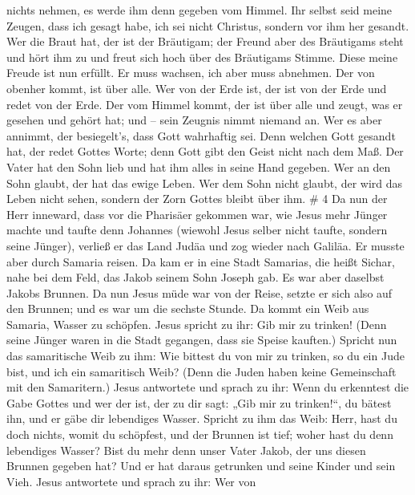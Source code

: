 nichts nehmen, es werde ihm denn gegeben vom Himmel.  Ihr
selbst seid meine Zeugen, dass ich gesagt habe, ich sei nicht Christus,
sondern vor ihm her gesandt.  Wer die Braut hat, der ist
der Bräutigam; der Freund aber des Bräutigams steht und hört ihm zu und
freut sich hoch über des Bräutigams Stimme. Diese meine Freude ist nun
erfüllt.  Er muss wachsen, ich aber muss abnehmen.
 Der von obenher kommt, ist über alle. Wer von der Erde
ist, der ist von der Erde und redet von der Erde. Der vom Himmel kommt,
der ist über alle  und zeugt, was er gesehen und gehört
hat; und -- sein Zeugnis nimmt niemand an.  Wer es aber
annimmt, der besiegelt's, dass Gott wahrhaftig sei.  Denn
welchen Gott gesandt hat, der redet Gottes Worte; denn Gott gibt den
Geist nicht nach dem Maß.  Der Vater hat den Sohn lieb und
hat ihm alles in seine Hand gegeben.  Wer an den Sohn
glaubt, der hat das ewige Leben. Wer dem Sohn nicht glaubt, der wird das
Leben nicht sehen, sondern der Zorn Gottes bleibt über ihm. \# 4
 Da nun der Herr inneward, dass vor die Pharisäer gekommen
war, wie Jesus mehr Jünger machte und taufte denn Johannes 
(wiewohl Jesus selber nicht taufte, sondern seine Jünger), 
verließ er das Land Judäa und zog wieder nach Galiläa.  Er
musste aber durch Samaria reisen.  Da kam er in eine Stadt
Samarias, die heißt Sichar, nahe bei dem Feld, das Jakob seinem Sohn
Joseph gab.  Es war aber daselbst Jakobs Brunnen. Da nun
Jesus müde war von der Reise, setzte er sich also auf den Brunnen; und
es war um die sechste Stunde.  Da kommt ein Weib aus
Samaria, Wasser zu schöpfen. Jesus spricht zu ihr: Gib mir zu trinken!
 (Denn seine Jünger waren in die Stadt gegangen, dass sie
Speise kauften.)  Spricht nun das samaritische Weib zu ihm:
Wie bittest du von mir zu trinken, so du ein Jude bist, und ich ein
samaritisch Weib? (Denn die Juden haben keine Gemeinschaft mit den
Samaritern.)  Jesus antwortete und sprach zu ihr: Wenn du
erkenntest die Gabe Gottes und wer der ist, der zu dir sagt: „Gib mir zu
trinken!{}``, du bätest ihn, und er gäbe dir lebendiges Wasser.
 Spricht zu ihm das Weib: Herr, hast du doch nichts, womit
du schöpfest, und der Brunnen ist tief; woher hast du denn lebendiges
Wasser?  Bist du mehr denn unser Vater Jakob, der uns
diesen Brunnen gegeben hat? Und er hat daraus getrunken und seine Kinder
und sein Vieh.  Jesus antwortete und sprach zu ihr: Wer von
